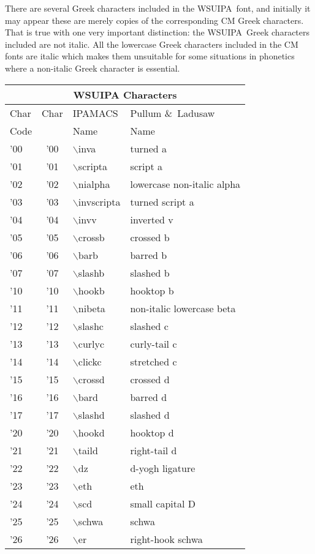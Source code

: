 \documentclass[12pt]{article}
\newcommand{\B}[1]{$\backslash$#1}
\newcommand{\wsu}{{\small\rm WSUIPA}}
\begin{document}
There are several Greek characters included in the \wsu\ font, and
initially it may appear these are merely copies of the corresponding
CM Greek characters. That is true with one very important distinction:
the \wsu\ Greek characters included are not italic. All the lowercase
Greek characters included in the CM fonts are italic which makes them
unsuitable for some situations in phonetics where a non-italic Greek
character is essential.

\newcommand{\D}[1]{#1&{\ipa\char#1}}
\raggedbottom
\begin{center}
\begin{tabular}{|l|c|l|l|}
\hline
\multicolumn{4}{|c|}{\bf WSUIPA Characters}\\
\hline\hline
Char&Char&{\sc IPAMACS}&{\sc Pullum \&\ Ladusaw}\\
Code&    &  Name       &  Name\\
\hline
\D{'00} &\B{inva}  &turned a\\
\D{'01} &\B{scripta} &script a\\
\D{'02} &\B{nialpha} &lowercase non-italic alpha\\
\D{'03} &\B{invscripta} &turned script a\\
\D{'04} &\B{invv} &inverted v\\
\D{'05} &\B{crossb} &crossed b\\
\D{'06} &\B{barb} &barred b\\
\D{'07} &\B{slashb} &slashed b\\
\D{'10} &\B{hookb} &hooktop b\\
\D{'11} &\B{nibeta} &non-italic lowercase beta\\
\D{'12} &\B{slashc} &slashed c\\
\D{'13} &\B{curlyc} &curly-tail c\\
\D{'14} &\B{clickc} &stretched c\\
\D{'15} &\B{crossd} &crossed d\\
\D{'16} &\B{bard} &barred d\\
\D{'17} &\B{slashd} &slashed d\\
\D{'20} &\B{hookd} &hooktop d\\
\D{'21} &\B{taild} &right-tail d\\
\D{'22} &\B{dz} &d-yogh ligature\\
\D{'23} &\B{eth} &eth\\
\D{'24} &\B{scd} &small capital D\\
\D{'25} &\B{schwa} &schwa\\
\D{'26} &\B{er} &right-hook schwa\\

\end{tabular}
\end{center}
\end{document}
